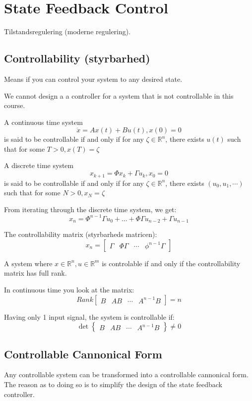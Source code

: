\section{State Feedback Control}

Tilstandsregulering (moderne regulering).


\subsection{Controllability (styrbarhed)}

Means if you can control your system to any desired state.

We cannot design a a controller for a system that is not controllable in this course.

A continuous time system
$$ \dot{x} = Ax(t) + Bu(t), x(0)=0 $$
is said to be controllable if and only if for any $\zeta \in \mathbb{R}^n$,
there exists $u(t)$ such that for some $T>0, x(T)=\zeta$




A discrete time system
$$x_{k+1} = \Phi x_k + \Gamma u_k, x_0=0$$
is said to be controllable if and only if for any $\zeta \in \mathbb{R}^n$, there exists
$(u_0, u_1, \cdots)$ such that for some $N>0, x_N=\zeta$

From iterating through the discrete time system, we get:
$$ x_n = \Phi^{n-1} \Gamma u_0 + \dots + \Phi \Gamma u_{n-2} + \Gamma u_{n-1} $$

The controllability matrix (styrbarheds matricen):
$$ x_n = \begin{bmatrix}  \Gamma & \Phi \Gamma & \cdots & \phi ^{n-1} \Gamma \end{bmatrix} $$

A system where $x \in \mathbb{R}^n, u \in \mathbb{R}^m$ is controlable if and only if the controllability
matrix has full rank.

In continuous time you look at the matrix:
$$ Rank \begin{bmatrix} B & AB & \cdots & A^{n-1}B \end{bmatrix} = n $$


Having only 1 input signal, the system is controllable if:
$$ \det \begin{Bmatrix} B & AB & \cdots & A^{n-1}B \end{Bmatrix} \neq 0 $$




\subsection{Controllable Cannonical Form}
Any controllable system can be transformed into a controllable cannonical form.
The reason as to doing so is to simplify the design of the state feedback controller.

